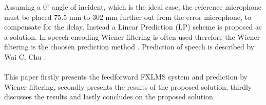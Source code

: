 Assuming a $\text{0}^{\circ}$ angle of incident, which is the ideal case, the reference microphone must be placed 75.5 mm to 302 mm further out from the error microphone, to compensate for the delay. Instead a Linear Prediction (LP) scheme is proposed as a solution. In speech encoding Wiener filtering is often used therefore the Wiener filtering is the choosen prediction method \cite{Speech}.
Prediction of speech is described by Wai C. Chu \cite{Speech}. 
\\\\
This paper firstly presents the feedforward FXLMS system and prediction by Wiener filtering, secondly presents the results of the proposed solution, thirdly discusses the results and lastly concludes on the proposed solution.
        
        
       
        
        







